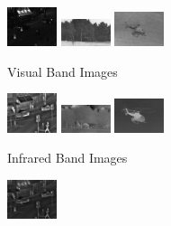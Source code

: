 \begin{figure}[htbp]
    \centering
    \begin{subfigure}[b]{\textwidth}
        \includegraphics[width=0.16\textwidth, height=0.1\textheight]{imgs/ch5/vis/02.png}
        \includegraphics[width=0.16\textwidth, height=0.1\textheight]{imgs/ch5/vis/07.png}
        \includegraphics[width=0.16\textwidth, height=0.1\textheight]{imgs/ch5/vis/11.png}
        \captionsetup{justification=raggedright,singlelinecheck=false}
        \caption{Visual Band Images}
        \label{fig:ch5:met4:vis}
    \end{subfigure}
    \vspace{0.01cm}
    \begin{subfigure}[b]{\textwidth}
        \includegraphics[width=0.16\textwidth, height=0.1\textheight]{imgs/ch5/ir/02.png}
        \includegraphics[width=0.16\textwidth, height=0.1\textheight]{imgs/ch5/ir/07.png}
        \includegraphics[width=0.16\textwidth, height=0.1\textheight]{imgs/ch5/ir/11.png}
        \captionsetup{justification=raggedright,singlelinecheck=false}
        \caption{Infrared Band Images}
        \label{fig:ch5:met4:ir}
    \end{subfigure}
    \vspace{0.01cm}
    \begin{subfigure}[b]{\textwidth}
        \includegraphics[width=0.16\textwidth, height=0.1\textheight]{imgs/ch5/ours/02.jpg}

\end{subfigure}
\end{figure}
